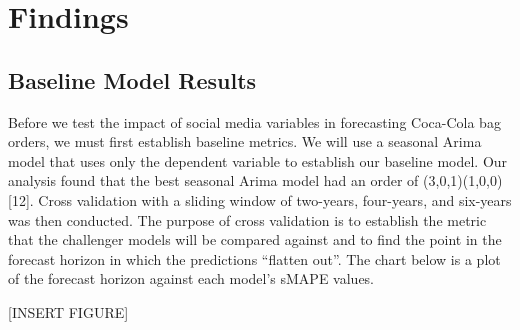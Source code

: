 \documentclass[12pt,oneside]{chicagocapstone}
\begin{document}
\chapter*{Findings}\label{findings}

\section*{Baseline Model Results}\label{baseline-model-results}

Before we test the impact of social media variables in forecasting
Coca-Cola bag orders, we must first establish baseline metrics. We will
use a seasonal Arima model that uses only the dependent variable to
establish our baseline model. Our analysis found that the best seasonal
Arima model had an order of (3,0,1)(1,0,0){[}12{]}. Cross validation
with a sliding window of two-years, four-years, and six-years was then
conducted. The purpose of cross validation is to establish the metric
that the challenger models will be compared against and to find the
point in the forecast horizon in which the predictions ``flatten out''.
The chart below is a plot of the forecast horizon against each model's
sMAPE values.

{[}INSERT FIGURE{]}
\end{document}
